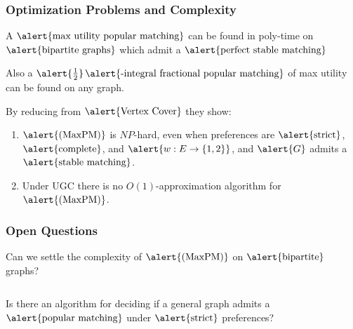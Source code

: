 \documentclass[10pt]{beamer}
\begin{document}
\begin{frame}
\frametitle{Optimization Problems and Complexity}
A $\text{\alert{max utility popular matching}}$ can be found in poly-time on $\text{\alert{bipartite graphs}}$ which admit a $\text{\alert{perfect stable matching}}$

Also a $\alert{\frac{1}{2}}$$\text{\alert{-integral fractional popular matching}}$ of max utility can be found on any graph.

By reducing from $\text{\alert{Vertex Cover}}$ they show:
\begin{enumerate}
\item $\text{\alert{(MaxPM)}}$ is $NP$-hard, even when preferences are $\text{\alert{strict}}$, $\text{\alert{complete}}$, and $\alert{w: E \rightarrow \{1,2\}}$, and $\alert{G}$ admits a $\text{\alert{stable matching}}$.
\item Under UGC there is no $O(1)$-approximation algorithm for $\text{\alert{(MaxPM)}}$.
\end{enumerate}
\end{frame}

\begin{frame}
\frametitle{Open Questions}

Can we settle the complexity of $\text{\alert{(MaxPM)}}$ on $\text{\alert{bipartite}}$ graphs?

$$ $$

Is there an algorithm for deciding if a general graph admits a $\text{\alert{popular matching}}$ under $\text{\alert{strict}}$ preferences?
\end{frame}
\end{document}
